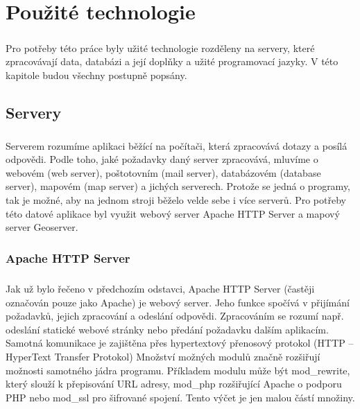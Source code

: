 \documentclass[11pt,a4paper,titlepage,oneside]{book}
\begin{document}
\chapter{Použité technologie}
	\paragraph{} Pro potřeby této práce byly užité technologie rozděleny na servery, které zpracovávají data, databázi a její doplňky a užité programovací jazyky. V této kapitole budou všechny postupně popsány.

	\section{Servery}
		\paragraph{} Serverem rozumíme aplikaci běžící na počítači, která zpracovává dotazy a posílá odpovědi. Podle toho, jaké požadavky daný server zpracovává, mluvíme o webovém (web server), poštotovním (mail server), databázovém (database server), mapovém (map server) a jichých serverech. Protože se jedná o programy, tak je možné, aby na jednom stroji běželo velde sebe i více serverů. Pro potřeby této datové aplikace byl využit webový server Apache HTTP Server\cite{apache} a mapový server Geoserver.
		\subsection{Apache HTTP Server}
			\paragraph{} Jak už bylo řečeno v předchozím odstavci, Apache HTTP Server (častěji označován pouze jako Apache) je webový server. Jeho funkce spočívá v přijímání požadavků, jejich zpracování a odeslání odpovědi. Zpracováním se rozumí např. odeslání statické webové stránky nebo předání požadavku dalším aplikacím. Samotná komunikace je zajištěna přes hypertextový přenosový protokol (HTTP -- HyperText Transfer Protokol) Množství možných modulů značně rozšiřují možnosti samotného jádra programu. Příkladem modulu může být mod\_rewrite, který slouží k přepisování URL adresy, mod\_php rozšiřující Apache o podporu PHP nebo mod\_ssl pro šifrované spojení. Tento výčet je jen malou částí množiny.
\end{document}
